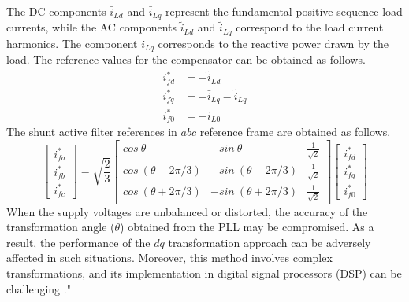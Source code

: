 The DC components $\bar{i}_{Ld}$ and $\bar{i}_{Lq}$ represent the fundamental positive sequence load currents, while the AC components $\tilde{i}_{Ld}$ and $\tilde{i}_{Lq}$ correspond to the load current harmonics. The component $\bar{i}_{Lq}$ corresponds to the reactive power drawn by the load. The reference values for the compensator can be obtained as follows.
 \begin{equation}
\begin{split}
 i^*_{fd} &=- \tilde{i}_{Ld}\\
   i^*_{fq}&=-\bar{i}_{Lq} - \tilde{i}_{Lq} \\
   i^*_{f0}&=-i_{L0}
 \end{split}
\label{eqn2.38}
\end{equation}
The shunt active filter references in $abc$ reference frame are obtained as follows.
\begin{equation}
\begin{bmatrix} i^*_{fa} \\  i^*_{fb} \\   i^*_{fc}
 \end{bmatrix}=  \sqrt{\frac{2}{3}}\begin{bmatrix} cos \:\theta & - sin \:\theta & \frac{1}{\sqrt{2}} \\cos \:(\theta -2 \pi/3) & - sin \:(\theta -2 \pi/3) & \frac{1}{\sqrt{2}} \\ cos \:(\theta + 2 \pi/3) & - sin \:(\theta + 2 \pi/3) & \frac{1}{\sqrt{2}}
\end{bmatrix} \begin{bmatrix}  i^*_{fd} \\ i^*_{fq} \\  i^*_{f0}
\end{bmatrix} 
\label{eqn2.39}
\end{equation}
When the supply voltages are unbalanced or distorted, the accuracy of the transformation angle ($\theta$) obtained from the PLL may be compromised. As a result, the performance of the $dq$ transformation approach can be adversely affected in such situations. Moreover, this method involves complex transformations, and its implementation in digital signal processors (DSP) can be challenging \cite{marques1998comparison,cardenas2003comparative}."
\vspace*{-.75cm}
